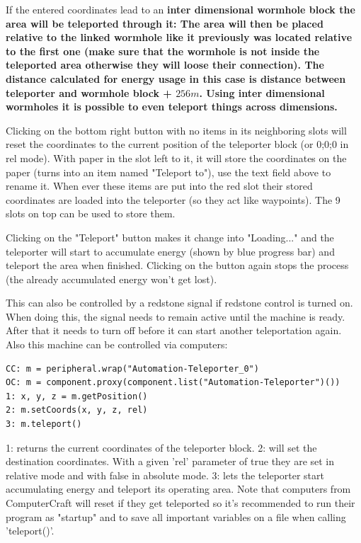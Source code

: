 \documentclass[11pt]{article} %
\begin{document}
If the entered coordinates lead to an \bf inter dimensional wormhole \rm block the area will be teleported through it: The area will then be placed relative to the linked wormhole like it previously was located relative to the first one (make sure that the wormhole is not inside the teleported area otherwise they will loose their connection). The distance calculated for energy usage in this case is distance between teleporter and wormhole block + $256m$. Using inter dimensional wormholes it is possible to even teleport things across dimensions.

Clicking on the bottom right button with no items in its neighboring slots will reset the coordinates to the current position of the teleporter block (or 0;0;0 in rel mode). With paper in the slot left to it, it will store the coordinates on the paper (turns into an item named "Teleport to"), use the text field above to rename it. When ever these items are put into the red slot their stored coordinates are loaded into the teleporter (so they act like waypoints). The 9 slots on top can be used to store them.

Clicking on the "Teleport" button makes it change into "Loading..." and the teleporter will start to accumulate energy (shown by blue progress bar) and teleport the area when finished. Clicking on the button again stops the process (the already accumulated energy won't get lost). 

This can also be controlled by a redstone signal if redstone control is turned on. When doing this, the signal needs to remain active until the machine is ready. After that it needs to turn off before it can start another teleportation again.\\

Also this machine can be controlled via computers:
\begin{lstlisting}
CC: m = peripheral.wrap("Automation-Teleporter_0")
OC: m = component.proxy(component.list("Automation-Teleporter")())
1: x, y, z = m.getPosition()
2: m.setCoords(x, y, z, rel)
3: m.teleport()
\end{lstlisting}
1: returns the current coordinates of the teleporter block. 2: will set the destination coordinates. With a given 'rel' parameter of true they are set in relative mode and with false in absolute mode. 3: lets the teleporter start accumulating energy and teleport its operating area. Note that computers from ComputerCraft will reset if they get teleported so it's recommended to run their program as "startup" and to save all important variables on a file when calling 'teleport()'. 
\end{document}
